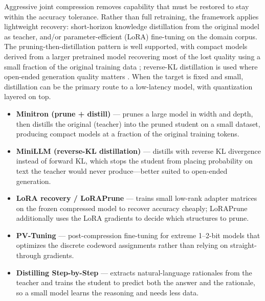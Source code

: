 \documentclass[
11pt, %
english, %
singlespacing, %
headsepline, %
]{MastersDoctoralThesis} %
\begin{document}
Aggressive joint compression removes capability that must be restored to stay within the accuracy tolerance. Rather than full retraining, the framework applies lightweight recovery: short-horizon knowledge distillation from the original model as teacher, and/or parameter-efficient (LoRA) fine-tuning on the domain corpus. The pruning-then-distillation pattern is well supported, with compact models derived from a larger pretrained model recovering most of the lost quality using a small fraction of the original training data \cite{muralidharan2024minitron}; reverse-KL distillation is used where open-ended generation quality matters \cite{gu2024minillm}. When the target is fixed and small, distillation can be the primary route to a low-latency model, with quantization layered on top.

\begin{itemize}

  \item \textbf{Minitron (prune + distill)} \cite{muralidharan2024minitron} --- prunes a large model in width and depth, then distills the original (teacher) into the pruned student on a small dataset, producing compact models at a fraction of the original training tokens.

  \item \textbf{MiniLLM (reverse-KL distillation)} \cite{gu2024minillm} --- distills with reverse KL divergence instead of forward KL, which stops the student from placing probability on text the teacher would never produce---better suited to open-ended generation.

  \item \textbf{LoRA recovery / LoRAPrune} \cite{ma2023llmpruner,zhang2024loraprune} --- trains small low-rank adapter matrices on the frozen compressed model to recover accuracy cheaply; LoRAPrune additionally uses the LoRA gradients to decide which structures to prune.

  \item \textbf{PV-Tuning} \cite{malinovskii2024pvtuning} --- post-compression fine-tuning for extreme 1--2-bit models that optimizes the discrete codeword assignments rather than relying on straight-through gradients.

  \item \textbf{Distilling Step-by-Step} \cite{hsieh2023distilling} --- extracts natural-language rationales from the teacher and trains the student to predict both the answer and the rationale, so a small model learns the reasoning and needs less data.

\end{itemize}
\end{document}
